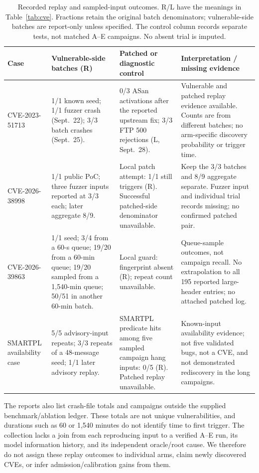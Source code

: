 \begin{table}[!tbp]
\centering\small
\caption{Recorded replay and sampled-input outcomes. R/L have the meanings in Table~\ref{tab:cve}. Fractions retain the original batch denominators; vulnerable-side batches are report-only unless specified. The control column records separate tests, not matched A--E campaigns. No absent trial is imputed.}
\label{tab:cveresults}
\begin{tabularx}{\textwidth}{@{}>{\raggedright\arraybackslash}p{} Y Y Y@{}}
\toprule
Case & Vulnerable-side batches (R) & Patched or diagnostic control & Interpretation / missing evidence \\
\midrule
\mbox{CVE-2023-51713} & 1/1 known seed; 1/1 fuzzer crash (Sept.~22); 3/3 batch crashes (Sept.~25). & 0/3 ASan activations after the reported upstream fix; 3/3 FTP 500 rejections (L, Sept.~28). & Vulnerable and patched replay evidence available. Counts are from different batches; no arm-specific discovery probability or trigger time. \\
\addlinespace[3pt]
\mbox{CVE-2026-38998} & 1/1 public PoC; three fuzzer inputs reported at 3/3 each; later aggregate 8/9. & Local patch attempt: 1/1 still triggers (R). Successful patched-side denominator unavailable. & Keep the 3/3 batches and 8/9 aggregate separate. Fuzzer input and individual trial records missing; no confirmed patched pair. \\
\addlinespace[3pt]
\mbox{CVE-2026-39863} & 1/1 seed; 3/4 from a 60-s queue; 19/20 from a 60-min queue; 19/20 sampled from a 1,540-min queue; 50/51 in another 60-min batch. & Local guard: fingerprint absent (R); repeat count unavailable. & Queue-sample outcomes, not campaign recall. No extrapolation to all 195 reported large-header entries; no attached patched log. \\
\addlinespace[3pt]
SMARTPL availability case & 5/5 advisory-input repeats; 3/3 repeats of a 48-message seed; 1/1 later advisory replay. & SMARTPL predicate hits among five sampled campaign hang inputs: 0/5 (R). Patched replay unavailable. & Known-input availability evidence; not five validated bugs, not a CVE, and not demonstrated rediscovery in the long campaigns. \\
\bottomrule
\end{tabularx}
\end{table}

The reports also list crash-file totals and campaigns outside the supplied benchmark/ablation ledger. These totals are not unique vulnerabilities, and durations such as 60 or 1,540 minutes do not identify time to first trigger. The collection lacks a join from each reproducing input to a verified A--E run, its model information history, and its independent oracle/root cause. We therefore do not assign these replay outcomes to individual arms, claim newly discovered CVEs, or infer admission/calibration gains from them.


